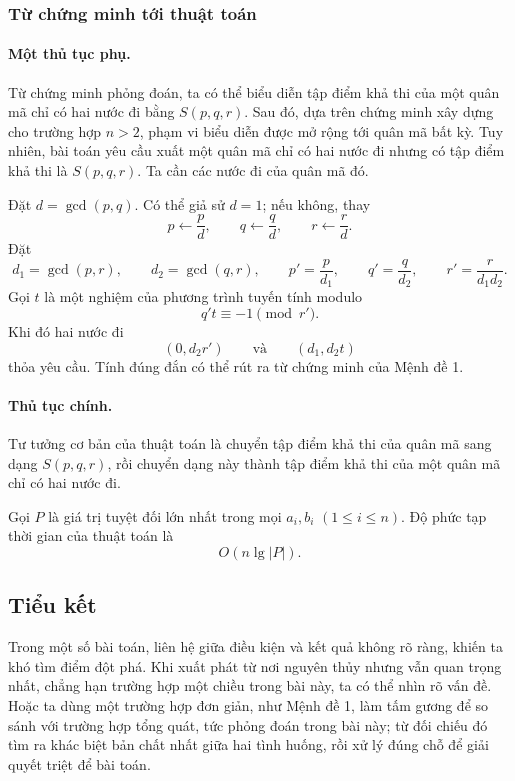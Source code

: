 \documentclass[11pt]{article}
\begin{document}
\subsubsection{Từ chứng minh tới thuật toán}

\paragraph{Một thủ tục phụ.}
Từ chứng minh phỏng đoán, ta có thể biểu diễn tập điểm khả thi của một quân mã
chỉ có hai nước đi bằng \(S(p,q,r)\). Sau đó, dựa trên chứng minh xây dựng cho
trường hợp \(n>2\), phạm vi biểu diễn được mở rộng tới quân mã bất kỳ. Tuy
nhiên, bài toán yêu cầu xuất một quân mã chỉ có hai nước đi nhưng có tập điểm
khả thi là \(S(p,q,r)\). Ta cần các nước đi của quân mã đó.

Đặt \(d=\gcd(p,q)\). Có thể giả sử \(d=1\); nếu không, thay
\[
  p\leftarrow \frac pd,\qquad
  q\leftarrow \frac qd,\qquad
  r\leftarrow \frac rd.
\]
Đặt
\[
  d_1=\gcd(p,r),\qquad
  d_2=\gcd(q,r),\qquad
  p'=\frac p{d_1},\qquad
  q'=\frac q{d_2},\qquad
  r'=\frac r{d_1d_2}.
\]
Gọi \(t\) là một nghiệm của phương trình tuyến tính modulo
\[
  q't\equiv -1\pmod{r'}.
\]
Khi đó hai nước đi
\[
  (0,d_2r')\qquad\text{và}\qquad (d_1,d_2t)
\]
thỏa yêu cầu. Tính đúng đắn có thể rút ra từ chứng minh của Mệnh đề 1.

\paragraph{Thủ tục chính.}
Tư tưởng cơ bản của thuật toán là chuyển tập điểm khả thi của quân mã sang
dạng \(S(p,q,r)\), rồi chuyển dạng này thành tập điểm khả thi của một quân mã
chỉ có hai nước đi.

Gọi \(P\) là giá trị tuyệt đối lớn nhất trong mọi \(a_i,b_i\)
\((1\le i\le n)\). Độ phức tạp thời gian của thuật toán là
\[
  O(n\lg |P|).
\]

\subsection{Tiểu kết}

Trong một số bài toán, liên hệ giữa điều kiện và kết quả không rõ ràng, khiến
ta khó tìm điểm đột phá. Khi xuất phát từ nơi nguyên thủy nhưng vẫn quan trọng
nhất, chẳng hạn trường hợp một chiều trong bài này, ta có thể nhìn rõ vấn đề.
Hoặc ta dùng một trường hợp đơn giản, như Mệnh đề 1, làm tấm gương để so sánh
với trường hợp tổng quát, tức phỏng đoán trong bài này; từ đối chiếu đó tìm ra
khác biệt bản chất nhất giữa hai tình huống, rồi xử lý đúng chỗ để giải quyết
triệt để bài toán.
\end{document}
